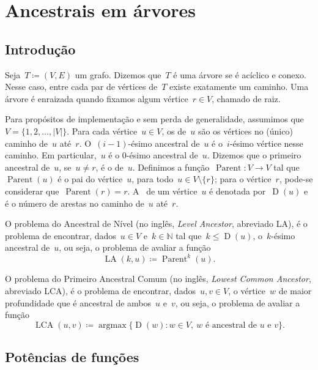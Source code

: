 \documentclass[../../main.tex]{subfiles}
\begin{document}
\providecommand{\Par}{\operatorname{Parent}}
\newcommand{\LA}{\operatorname{LA}}
\newcommand{\Dep}{\operatorname{D}}
\newcommand{\LCA}{\operatorname{LCA}}
\newcommand{\argmax}{\operatorname{argmax}}

\chapter{Ancestrais em árvores} \label{cap:ancestrais}

\section{Introdução}

Seja~$T \coloneqq (V, E)$ um grafo. Dizemos que~$T$ é uma árvore se é acíclico e conexo. Nesse caso, entre cada par de vértices de~$T$ existe exatamente um caminho. Uma árvore é enraizada quando fixamos algum vértice~${r \in V}$, chamado de raiz.

Para propósitos de implementação e sem perda de generalidade, assumimos que~$V = \{1, 2, \ldots, |V|\}$.
Para cada vértice~${u \in V}$, os  de~$u$ são os vértices no (único) caminho de~$u$ até~$r$. O~\mbox{$(i-1)$-ésimo} ancestral de~$u$ é o~$i$-ésimo vértice nesse caminho. Em particular,~$u$ é o $0$-ésimo ancestral de~$u$. Dizemos que o primeiro ancestral de~$u$, se~$u \neq r$, é o  de~$u$. Definimos a função~${\Par: V \rightarrow V}$ tal que~$\Par(u)$ é o pai do vértice~$u$, para todo~$u \in V \setminus \{r\}$; para o vértice~$r$, pode-se considerar que~$\Par(r) = r$. A~ de um vértice~$u$ é denotada por~$\Dep(u)$ e é o número de arestas no caminho de~$u$ até~$r$.

O problema do Ancestral de Nível (no inglês, \textit{Level Ancestor}, abreviado LA), é o problema de encontrar, dados~$u \in V$ e~$k \in \mathbb{N}$ tal que~$k \leq \Dep(u)$, o~$k$-ésimo ancestral de~$u$, ou seja, o problema de avaliar a função
$$\LA(k, u) \coloneqq \Par^k(u). $$

O problema do Primeiro Ancestral Comum (no inglês, \textit{Lowest Common Ancestor}, abreviado LCA), é o problema de encontrar, dados~$u, v \in V$, o vértice~$w$ de maior profundidade que é ancestral de ambos~$u$ e~$v$, ou seja, o problema de avaliar a função
$$\LCA(u, v) \coloneqq \argmax\{\Dep(w) : w \in V,\ w \text{ é ancestral de $u$ e $v$}\}. $$

\section{Potências de funções} \label{sec:potfunc}
\end{document}
